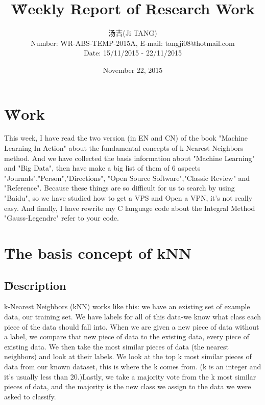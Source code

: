 \documentclass[12pt]{article}
\title{{\H Weekly Report of Research Work\\ }\quad {WR-ABS-TEMP-2015A-No.001}}
\author{汤吉(Ji TANG)\\
               Number: WR-ABS-TEMP-2015A,  E-mail: tangji08@hotmail.com \\
        Date: 15/11/2015 - 22/11/2015}
\date{November 22, 2015}
\begin{document}
  
\maketitle
\pagestyle{fancy}
\fancyhead[LO,RE]{\leftmark} %



\renewcommand{\headrulewidth}{0.4pt}
\renewcommand{\footrulewidth}{0.4pt}



\tableofcontents 
\newpage
\section{\H Work}
This week, I have read the two version (in EN and CN) of the book "Machine Learning In Action" about the fundamental concepts of k-Nearest Neighbors method. And we have collected the basis information about "Machine Learning" and "Big Data", then have make a big list of them of 6 aspects "Journals","Person","Directions", "Open Source Software","Classic Review" and "Reference". Because these things are so difficult for us to search by using "Baidu", so we have studied how to get a VPS and Open a VPN, it's not really easy. And finally, I have rewrite my C language code about the Integral Method "Gauss-Legendre" refer to your code.
\section{\H The basis concept of kNN}
\subsection{\H Description}
k-Nearest Neighbors (kNN) works like this: we have an existing set of example data, our training set. We have labels for all of this data-we know what class each piece of the data should fall into. When we are given a new piece of data without a label, we compare that new piece of data to the existing data, every piece of existing data. We then take the most similar pieces of data (the nearest neighbors) and look at their labels. We look at the top k most similar pieces of data from our known dataset, this is where the k comes from. (k is an integer and it's usually less than 20.)Lastly, we take a majority vote from the k most similar pieces of data, and the majority is the new class we assign to the data we were asked to classify.
\end{document}
